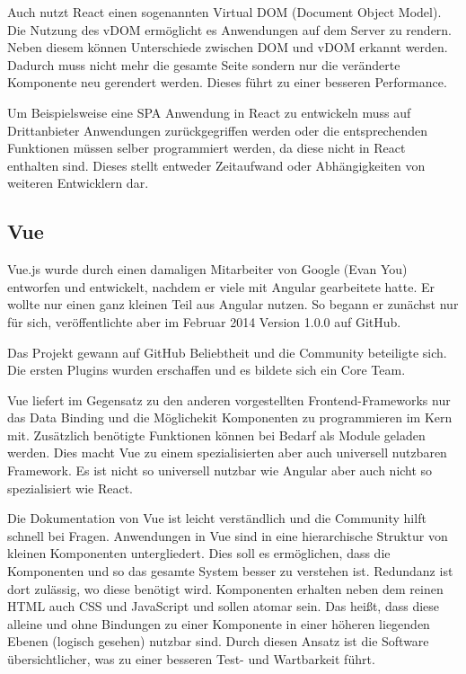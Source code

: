 Auch nutzt React einen sogenannten Virtual DOM (Document Object Model). Die Nutzung des vDOM ermöglicht es Anwendungen auf dem Server zu rendern. Neben diesem können Unterschiede zwischen DOM und vDOM erkannt werden. Dadurch muss nicht mehr die gesamte Seite sondern nur die veränderte Komponente neu gerendert werden. Dieses führt zu einer besseren Performance. \cite{bezJavaScriptEinfuehrungReact2015}

Um Beispielsweise eine SPA Anwendung in React zu entwickeln muss auf Drittanbieter Anwendungen zurückgegriffen werden oder die entsprechenden Funktionen müssen selber programmiert werden, da diese nicht in React enthalten sind. Dieses stellt entweder Zeitaufwand oder Abhängigkeiten von weiteren Entwicklern dar.

\subsection{Vue}
Vue.js wurde durch einen damaligen Mitarbeiter von Google (Evan You) entworfen und entwickelt, nachdem er viele mit Angular gearbeitete hatte. Er wollte nur einen ganz kleinen Teil aus Angular nutzen. So begann er zunächst nur für sich, veröffentlichte aber im Februar 2014 Version 1.0.0 auf GitHub.

Das Projekt gewann auf GitHub Beliebtheit und die Community beteiligte sich. Die ersten Plugins wurden erschaffen und es bildete sich ein Core Team.

Vue liefert im Gegensatz zu den anderen vorgestellten Frontend-Frameworks nur das Data Binding und die Möglichekit Komponenten zu programmieren im Kern mit. Zusätzlich benötigte Funktionen können bei Bedarf als Module geladen werden. Dies macht Vue zu einem spezialisierten aber auch universell nutzbaren Framework. Es ist nicht so universell nutzbar wie Angular aber auch nicht so spezialisiert wie React.\cite{teufelVueJsTutorial2018}

Die Dokumentation von Vue ist leicht verständlich und die Community hilft schnell bei Fragen. 
Anwendungen in Vue sind in eine hierarchische Struktur von kleinen Komponenten untergliedert. Dies soll es ermöglichen, dass die Komponenten und so das gesamte System besser zu verstehen ist. Redundanz ist dort zulässig, wo diese benötigt wird.
Komponenten erhalten neben dem reinen HTML auch CSS und JavaScript und sollen atomar sein. Das heißt, dass diese alleine und ohne Bindungen zu einer Komponente in einer höheren liegenden Ebenen (logisch gesehen) nutzbar sind. Durch diesen Ansatz ist die Software übersichtlicher, was zu einer besseren Test- und Wartbarkeit führt.

